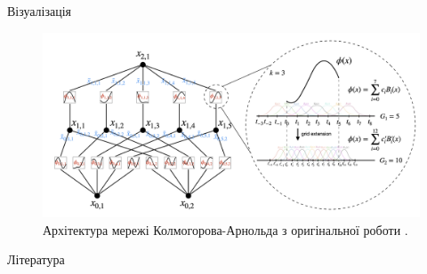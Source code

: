 \documentclass{zkdl-presentation-template}
\begin{document}
    \begin{frame}{Візуалізація}
        \begin{figure}
            \includegraphics[width=\textwidth]{images/kan.png}
            \caption{Архітектура мережі Колмогорова-Арнольда з оригінальної роботи \cite{kan}.}
        \end{figure}
    \end{frame}


    \begin{frame}[allowframebreaks]{Література}
        \printbibliography
    \end{frame}
\end{document}
